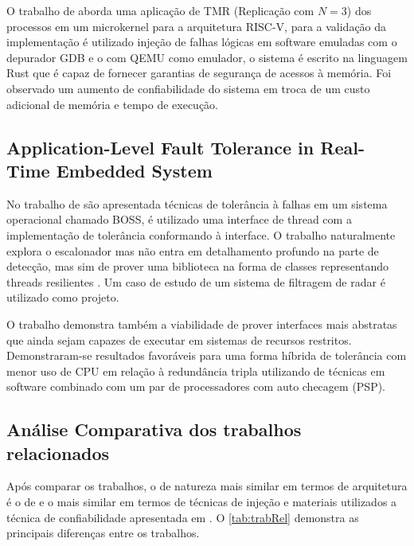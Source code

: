 O trabalho de  aborda uma aplicação de TMR (Replicação com $N = 3$) dos processos em um microkernel para a arquitetura RISC-V, para a validação da implementação é utilizado injeção de falhas lógicas em software emuladas com o depurador GDB e o com QEMU como emulador, o sistema é escrito na linguagem Rust que é capaz de fornecer garantias de segurança de acessos à memória. Foi observado um aumento de confiabilidade do sistema em troca de um custo adicional de memória e tempo de execução.

\subsection{Application-Level Fault Tolerance in Real-Time Embedded System}

No trabalho de  são apresentada técnicas de tolerância à falhas em um sistema operacional chamado BOSS, é utilizado uma interface de thread com a implementação de tolerância conformando à interface. O trabalho naturalmente explora o escalonador mas não entra em detalhamento profundo na parte de detecção, mas sim de prover uma biblioteca na forma de classes representando threads resilientes \cite{ApplicationLevelFT}. Um caso de estudo de um sistema de filtragem de radar é utilizado como projeto.

O trabalho demonstra também a viabilidade de prover interfaces mais abstratas que ainda sejam capazes de executar em sistemas de recursos restritos. Demonstraram-se resultados favoráveis para uma forma híbrida de tolerância com menor uso de CPU em relação à redundância tripla utilizando de técnicas em software combinado com um par de processadores com auto checagem (PSP).

\subsection{Análise Comparativa dos trabalhos relacionados}

Após comparar os trabalhos, o de natureza mais similar em termos de arquitetura é o de  e o mais similar em termos de técnicas de injeção e materiais utilizados a técnica de confiabilidade apresentada em . O \autoref{tab:trabRel} demonstra as principais diferenças entre os trabalhos.

